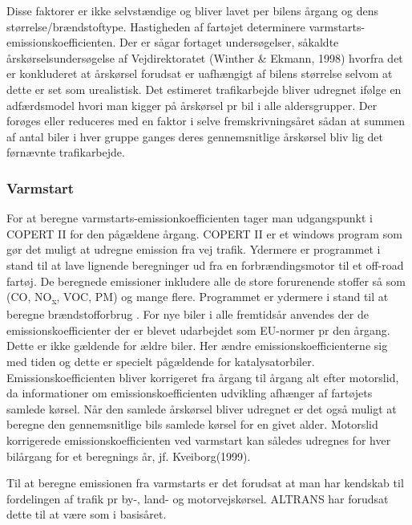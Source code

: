 \vspace{5mm}

Disse faktorer er ikke selvstændige og bliver lavet per bilens årgang og dens størrelse/brændstoftype. Hastigheden af fartøjet determinere varmstarts-emissionskoefficienten. Der er sågar fortaget undersøgelser, såkaldte årskørselsundersøgelse af Vejdirektoratet (Winther \& Ekmann, 1998) hvorfra det er konkluderet at årskørsel forudsat er uafhængigt af bilens størrelse selvom at dette er set som urealistisk. Det estimeret trafikarbejde bliver udregnet ifølge en adfærdsmodel hvori man kigger på årskørsel pr bil i alle aldersgrupper. Der forøges eller reduceres med en faktor i selve fremskrivningsåret sådan at summen af antal biler i hver gruppe ganges deres gennemsnitlige årskørsel bliv lig det førnævnte trafikarbejde.

\subsubsection{Varmstart}
For at beregne varmstarts-emissionkoefficienten tager man udgangspunkt i COPERT II for den pågældene årgang. COPERT II er et windows program som gør det muligt at udregne emission fra vej trafik. Ydermere er programmet i stand til at lave lignende beregninger ud fra en forbrændingsmotor til et off-road fartøj. De beregnede emissioner inkludere alle de store forurenende stoffer så som (CO, NO\textsubscript{x}, VOC, PM) og mange flere. Programmet er ydermere i stand til at beregne brændstofforbrug \cite[s 4]{COPERTII}.  For nye biler i alle fremtidsår anvendes der de emissionskoefficienter der er blevet udarbejdet som EU-normer pr den årgang. Dette er ikke gældende for ældre biler. Her ændre emissionskoefficienterne sig med tiden og dette er specielt pågældende for katalysatorbiler. Emissionskoefficienten bliver korrigeret fra årgang til årgang alt efter motorslid, da informationer om emissionskoefficienten udvikling afhænger af fartøjets samlede kørsel. Når den samlede årskørsel bliver udregnet er det også muligt at beregne den gennemsnitlige bils samlede kørsel for en givet alder. Motorslid korrigerede emissionskoefficienten ved varmstart kan således udregnes for hver bilårgang for et beregnings år, jf. Kveiborg(1999).

\vspace{5mm}

Til at beregne emissionen fra varmstarts er det forudsat at man har kendskab til fordelingen af trafik pr by-, land- og motorvejskørsel. ALTRANS har forudsat dette til at være som i basisåret.
